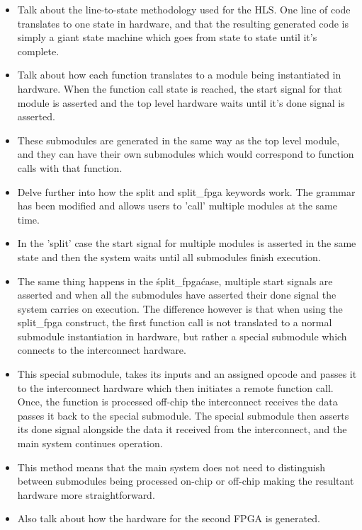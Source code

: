 \begin{itemize}
    \item Talk about the line-to-state methodology used for the HLS. One line of code translates to one state in hardware, and that the resulting generated code is simply a giant state machine which goes from state to state until it's complete.
    \item Talk about how each function translates to a module being instantiated in hardware. When the function call state is reached, the start signal for that module is asserted and the top level hardware waits until it's done signal is asserted.
    \item These submodules are generated in the same way as the top level module, and they can have their own submodules which would correspond to function calls with that function.
    \item Delve further into how the split and split\_fpga keywords work. The grammar has been modified and allows users to 'call' multiple modules at the same time.
    \item In the 'split' case the start signal for multiple modules is asserted in the same state and then the system waits until all submodules finish execution.
    \item The same thing happens in the \'split\_fpga\' case, multiple start signals are asserted and when all the submodules have asserted their done signal the system carries on execution. The difference however is that when using the split\_fpga construct, the first function call is not translated to a normal submodule instantiation in hardware, but rather a special submodule which connects to the interconnect hardware.
    \item This special submodule, takes its inputs and an assigned opcode and passes it to the interconnect hardware which then initiates a remote function call. Once, the function is processed off-chip the interconnect receives the data passes it back to the special submodule. The special submodule then asserts its done signal alongside the data it received from the interconnect, and the main system continues operation.
    \item This method means that the main system does not need to distinguish between submodules being processed on-chip or off-chip making the resultant hardware more straightforward.
    \item Also talk about how the hardware for the second FPGA is generated.
\end{itemize}

